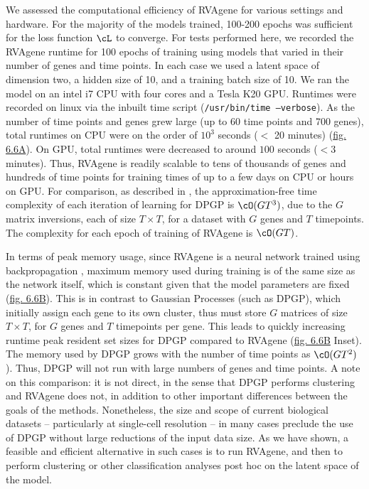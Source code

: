 We assessed the computational efficiency of RVAgene for various settings and hardware. For the
majority of the models trained, 100-200 epochs was sufficient for the loss function $\cL$ to
converge. For tests performed here, we recorded the RVAgene runtime for 100 epochs of training using
models that varied in their number of genes and time points. In each case we used a latent space of
dimension two, a hidden size of 10, and a training batch size of 10. We ran the model on an intel i7
CPU with four cores and a Tesla K20 GPU. Runtimes were recorded on linux via the inbuilt time script
(\texttt{/usr/bin/time --verbose}). As the number of time points and genes grew large (up to 60 time
points and 700 genes), total runtimes on CPU were on the order of $10^3$ seconds ($<$ 20 minutes)
(\hyperref[fig:fig7]{fig. 6.6A}). On GPU, total runtimes were decreased to around $100$ seconds ($< 3$ minutes). Thus, RVAgene is readily scalable to tens of thousands of genes and hundreds of time points for training times of up to a few days on CPU or hours on GPU. For comparison, as described in \citet{McDowell2018}, the approximation-free time complexity of each iteration of learning for DPGP is $\cO(GT^3)$, due to the $G$ matrix inversions, each of size $T \times T$, for a dataset with $G$ genes and $T$ timepoints. The complexity for each epoch of training of RVAgene is $\cO(GT)$.
\par 
In terms of peak memory usage, since RVAgene is a neural network trained using backpropagation
\citep{rumelhart1986learning}, maximum memory used during training is of the same size as the
network itself, which is constant given that the model parameters are fixed
(\hyperref[fig:fig7]{fig. 6.6B}). This is in contrast to Gaussian Processes (such as DPGP), which
initially assign each gene to its own cluster, thus must store $G$ matrices of size $T\times T $,
for $G$ genes and $T$ timepoints per gene. This leads to quickly increasing runtime peak resident
set sizes for DPGP compared to RVAgene (\hyperref[fig:fig7]{fig. 6.6B} Inset). The memory used by DPGP grows with the number of time points as $\cO(GT^2)$). Thus, DPGP will not run with large numbers of genes and time points. %
A note on this comparison: it is not direct, in the sense that DPGP performs clustering and RVAgene does not, in addition to other important differences between the goals of the methods. 
Nonetheless, the size and scope of current biological datasets -- particularly at single-cell resolution -- in many cases preclude the use of DPGP without large reductions of the input data size. As we have shown, a feasible and efficient alternative in such cases is to run RVAgene, and then to perform clustering or other classification analyses post hoc on the latent space of the model. 

